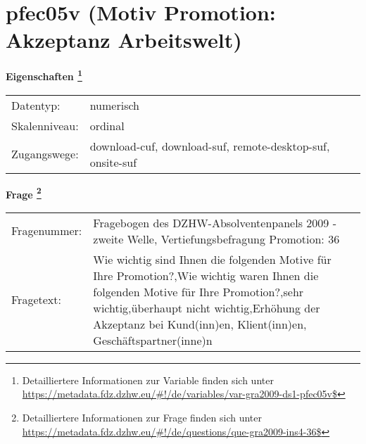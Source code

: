 
    \setcounter{footnote}{0}

    \vspace*{-1.8cm}
	\section{pfec05v (Motiv Promotion: Akzeptanz Arbeitswelt)}
	\label{section:pfec05v}



    \vspace*{0.5cm}
    \noindent\textbf{Eigenschaften
	\footnote{Detailliertere Informationen zur Variable finden sich unter
		\url{https://metadata.fdz.dzhw.eu/\#!/de/variables/var-gra2009-ds1-pfec05v$}}}\\
	\begin{tabularx}{\hsize}{@{}lX}
	Datentyp: & numerisch \\
	Skalenniveau: & ordinal \\
	Zugangswege: &
	  download-cuf, 
	  download-suf, 
	  remote-desktop-suf, 
	  onsite-suf
 \\
    \end{tabularx}



				\vspace*{0.5cm}
                \noindent\textbf{Frage
	                \footnote{Detailliertere Informationen zur Frage finden sich unter
		              \url{https://metadata.fdz.dzhw.eu/\#!/de/questions/que-gra2009-ins4-36$}}}\\
				\begin{tabularx}{\hsize}{@{}lX}
					Fragenummer: &
					  Fragebogen des DZHW-Absolventenpanels 2009 - zweite Welle, Vertiefungsbefragung Promotion:
					  36
 \\
					Fragetext: & Wie wichtig sind Ihnen die folgenden Motive für Ihre Promotion?,Wie wichtig waren Ihnen die folgenden Motive für Ihre Promotion?,sehr wichtig,überhaupt nicht wichtig,Erhöhung der Akzeptanz bei Kund(inn)en, Klient(inn)en, Geschäftspartner(inne)n \\
				\end{tabularx}






